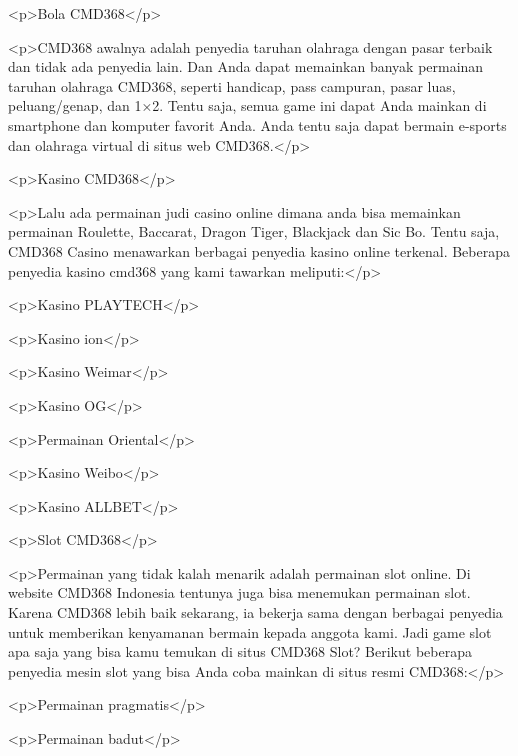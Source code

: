<p>Bola CMD368</p>



<p>CMD368 awalnya adalah penyedia taruhan olahraga dengan pasar terbaik dan tidak ada penyedia lain. Dan Anda dapat memainkan banyak permainan taruhan olahraga CMD368, seperti handicap, pass campuran, pasar luas, peluang/genap, dan 1×2. Tentu saja, semua game ini dapat Anda mainkan di smartphone dan komputer favorit Anda. Anda tentu saja dapat bermain e-sports dan olahraga virtual di situs web CMD368.</p>



<p>Kasino CMD368</p>



<p>Lalu ada permainan judi casino online dimana anda bisa memainkan permainan Roulette, Baccarat, Dragon Tiger, Blackjack dan Sic Bo. Tentu saja, CMD368 Casino menawarkan berbagai penyedia kasino online terkenal. Beberapa penyedia kasino cmd368 yang kami tawarkan meliputi:</p>



<p>Kasino PLAYTECH</p>



<p>Kasino ion</p>



<p>Kasino Weimar</p>



<p>Kasino OG</p>



<p>Permainan Oriental</p>



<p>Kasino Weibo</p>



<p>Kasino ALLBET</p>



<p>Slot CMD368</p>



<p>Permainan yang tidak kalah menarik adalah permainan slot online. Di website CMD368 Indonesia tentunya juga bisa menemukan permainan slot. Karena CMD368 lebih baik sekarang, ia bekerja sama dengan berbagai penyedia untuk memberikan kenyamanan bermain kepada anggota kami. Jadi game slot apa saja yang bisa kamu temukan di situs CMD368 Slot? Berikut beberapa penyedia mesin slot yang bisa Anda coba mainkan di situs resmi CMD368:</p>



<p>Permainan pragmatis</p>



<p>Permainan badut</p>



